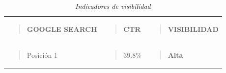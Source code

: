 \documentclass[
]{interact}
\begin{document}
\begin{longtable}[]{@{}
  >{\raggedright\arraybackslash}p{}
  >{\raggedright\arraybackslash}p{}
  >{\raggedright\arraybackslash}p{}@{}}
\caption{\emph{Indicadores de visibilidad}}\tabularnewline
\toprule\noalign{}
\endfirsthead
\endhead
\bottomrule\noalign{}
\endlastfoot
\begin{minipage}[t]{\linewidth}\raggedright
\begin{quote}
\textbf{GOOGLE SEARCH}
\end{quote}
\end{minipage} & \begin{minipage}[t]{\linewidth}\raggedright
\begin{quote}
\textbf{CTR}
\end{quote}
\end{minipage} & \begin{minipage}[t]{\linewidth}\raggedright
\begin{quote}
\textbf{VISIBILIDAD}
\end{quote}
\end{minipage} \\
\begin{minipage}[t]{\linewidth}\raggedright
\begin{quote}
Posición 1
\end{quote}
\end{minipage} & \begin{minipage}[t]{\linewidth}\raggedright
\begin{quote}
39.8\%
\end{quote}
\end{minipage} & \begin{minipage}[t]{\linewidth}\raggedright
\begin{quote}
\textbf{Alta}


\end{quote}
\end{minipage}
\end{longtable}
\end{document}
